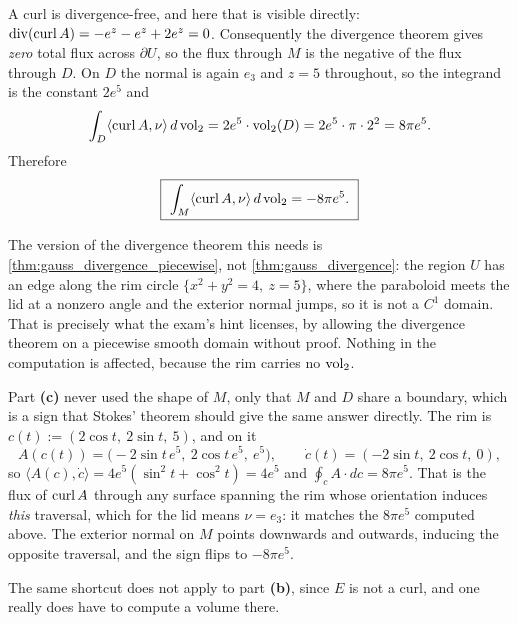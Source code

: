 \begin{exercisesolution}
\begin{enumerate}[label=\textbf{(\alph*)}]
    A curl is divergence-free, and here that is visible directly:
    $\operatorname{div}(\operatorname{curl} A) = -e^z - e^z + 2e^z = 0$. Consequently the divergence theorem gives
    \emph{zero} total flux across $\partial U$, so the flux through $M$ is the negative of the flux
    through $D$. On $D$ the normal is again $e_3$ and $z = 5$ throughout, so the integrand is the
    constant $2e^5$ and
    \[\int_D \langle \operatorname{curl} A,\nu\rangle\,d\operatorname{vol}_2 = 2e^5 \cdot \operatorname{vol}_2(D) = 2e^5\cdot\pi\cdot 2^2
      = 8\pi e^5 .\]
    Therefore
    \[\boxed{\ \int_M \langle \operatorname{curl} A,\nu\rangle\,d\operatorname{vol}_2 = -8\pi e^5.\ }\]
\end{enumerate}
\begin{ainote}
The version of the divergence theorem this needs is \cref{thm:gauss_divergence_piecewise}, not
\cref{thm:gauss_divergence}: the region $U$ has an edge along the rim circle
$\{x^2+y^2=4,\ z=5\}$, where the paraboloid meets the lid at a nonzero angle and the exterior
normal jumps, so it is not a $C^1$ domain. That is precisely what the exam's hint licenses, by
allowing the divergence theorem on a piecewise smooth domain without proof. Nothing in the
computation is affected, because the rim carries no $\operatorname{vol}_2$.
\end{ainote}
\begin{remark}
Part \textbf{(c)} never used the shape of $M$, only that $M$ and $D$ share a boundary, which is a
sign that Stokes' theorem should give the same answer directly. The rim is
$c(t) := (2\cos t,\ 2\sin t,\ 5)$, and on it
\[A(c(t)) = \big(-2\sin t\,e^5,\ 2\cos t\,e^5,\ e^5\big), \qquad
  \dot c(t) = (-2\sin t,\ 2\cos t,\ 0),\]
so $\langle A(c),\dot c\rangle = 4e^5(\sin^2 t + \cos^2 t) = 4e^5$ and
$\oint_c A\cdot dc = 8\pi e^5$. That is the flux of $\operatorname{curl} A$ through any surface spanning the rim
whose orientation induces \emph{this} traversal, which for the lid means $\nu = e_3$: it matches
the $8\pi e^5$ computed above. The exterior normal on $M$ points downwards and outwards, inducing
the opposite traversal, and the sign flips to $-8\pi e^5$.

The same shortcut does not apply to part \textbf{(b)}, since $E$ is not a curl, and one really does
have to compute a volume there.
\end{remark}
\end{exercisesolution}


